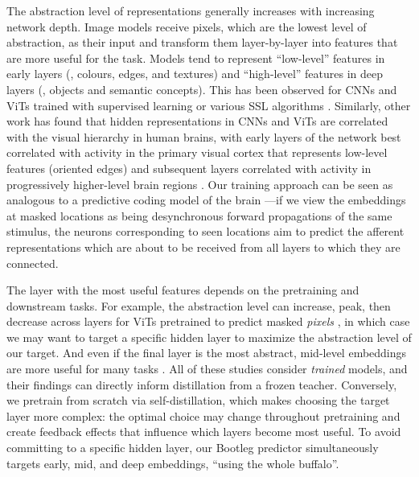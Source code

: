  The abstraction level of representations generally increases with increasing network depth.
Image models receive pixels, which are the lowest level of abstraction, as their input and transform them layer-by-layer into features that are more useful for the task.
Models tend to represent ``low-level'' features in early layers (\eg{}, colours, edges, and textures) and ``high-level'' features in deep layers (\eg{}, objects and semantic concepts).
This has been observed for CNNs \citep{zeiler2014visualizing, bau2017network, zhou2014object} and ViTs \citep{Raghu2021doViTsSeeCNNs, vilas2023analyzing} trained with supervised learning or various SSL algorithms \citep{park2023what, lepori2024beyond}.
Similarly, other work has found that hidden representations in CNNs and ViTs are correlated with the visual hierarchy in human brains, with early layers of the network best correlated with activity in the primary visual cortex that represents low-level features (oriented edges) and subsequent layers correlated with activity in progressively higher-level brain regions \citep{Yamins2014, Yamins2016, Horikawa2017, Tang2025, raugel2025disentanglingfactorsconvergencebrains}.
Our training approach can be seen as analogous to a predictive coding model of the brain \citep{Rao1999, friston2005, Friston2009, Clark2013, Keller2018, Nejad2025}---if we view the embeddings at masked locations as being desynchronous forward propagations of the same stimulus, the neurons corresponding to seen locations aim to predict the afferent representations which are about to be received from all layers to which they are connected.

The layer with the most useful features depends on the pretraining and downstream tasks.
For example, the abstraction level can increase, peak, then decrease across layers for ViTs pretrained to predict masked \emph{pixels} \citep{park2023what}, in which case we may want to target a specific hidden layer to maximize the abstraction level of our target.
And even if the final layer is the most abstract, mid-level embeddings are more useful for many tasks \citep{bolya2025perception, evci2022headtoe}.
All of these studies consider \emph{trained} models, and their findings can directly inform distillation from a frozen teacher.
Conversely, we pretrain from scratch via self-distillation, which makes choosing the target layer more complex: the optimal choice may change throughout pretraining and create feedback effects that influence which layers become most useful.
To avoid committing to a specific hidden layer, our Bootleg predictor simultaneously targets early, mid, and deep embeddings, ``using the whole buffalo''.


